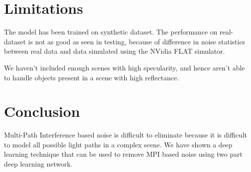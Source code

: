 \documentclass[a4paper, 11pt]{article}
\begin{document}

\section{Limitations}
The model has been trained on synthetic dataset. The performance on real-dataset is not as good as seen in testing, because of difference in noise statistics between real data and data simulated using the NVidia FLAT simulator. 

We haven't included enough scenes with high specularity, and hence aren't able to handle objects present in a scene with high reflectance. 



\section{Conclusion}

Multi-Path Interference based noise is difficult to eliminate because it is difficult to model all possible light paths in a complex scene. We have shown a deep learning technique that can be used to remove MPI based noise using two part deep learning network. 





\end{document}
